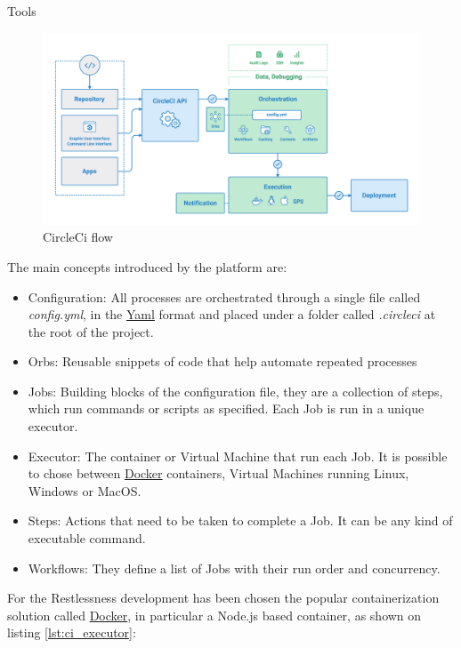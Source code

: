 \begin{chapter}{Tools}
    \begin{figure}
        \centering
        \includegraphics[width=\linewidth]{source/images/circle-ci.png}
        \caption{CircleCi flow \cite{circle_ci_official}}
        \label{fig:circle_ci_structure}
    \end{figure}

    \noindent
    The main concepts introduced by the platform are:
    \begin{itemize}
        \item Configuration: All processes are orchestrated through a single file
            called \mbox{\textit{config.yml}}, in the \href{https://yaml.org/}{Yaml}
            format and placed under a folder called \textit{.circleci} at the root
            of the project.
        \item Orbs: Reusable snippets of code that help automate repeated processes
        \item Jobs: Building blocks of the configuration file, they are a collection
            of steps, which run commands or scripts as specified. Each Job is run
            in a unique executor.
        \item Executor: The container or Virtual Machine that run each Job.
            It is possible to chose between \href{https://www.docker.com/}{Docker}
            containers, Virtual Machines running Linux, Windows or MacOS.
        \item Steps: Actions that need to be taken to complete a Job. It can be
            any kind of executable command.
        \item Workflows: They define a list of Jobs with their run order and
            concurrency.
    \end{itemize}

    For the Restlessness development has been chosen the popular containerization
    solution called \href{https://www.docker.com/}{Docker}, in particular a Node.js
    based container, as shown on listing \ref{lst:ci_executor}:


\end{chapter}
